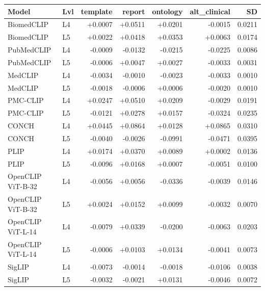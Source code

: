 \begin{tabular}{llrrrrr}
\toprule
Model & Lvl & template & report & ontology & alt_clinical & SD \\
\midrule
BiomedCLIP & L4 & +0.0007 & +0.0511 & +0.0201 & -0.0015 & 0.0211 \\
BiomedCLIP & L5 & +0.0022 & +0.0418 & +0.0353 & +0.0063 & 0.0174 \\
PubMedCLIP & L4 & -0.0009 & -0.0132 & -0.0215 & -0.0225 & 0.0086 \\
PubMedCLIP & L5 & -0.0006 & +0.0047 & +0.0027 & -0.0033 & 0.0031 \\
MedCLIP & L4 & -0.0034 & -0.0010 & -0.0023 & -0.0033 & 0.0010 \\
MedCLIP & L5 & -0.0018 & -0.0006 & +0.0006 & -0.0020 & 0.0010 \\
PMC-CLIP & L4 & +0.0247 & +0.0510 & +0.0209 & -0.0029 & 0.0191 \\
PMC-CLIP & L5 & -0.0121 & +0.0278 & +0.0157 & -0.0324 & 0.0235 \\
CONCH & L4 & +0.0445 & +0.0864 & +0.0128 & +0.0865 & 0.0310 \\
CONCH & L5 & -0.0040 & -0.0026 & -0.0991 & -0.0471 & 0.0395 \\
PLIP & L4 & +0.0174 & +0.0370 & +0.0089 & +0.0002 & 0.0136 \\
PLIP & L5 & -0.0096 & +0.0168 & +0.0007 & -0.0051 & 0.0100 \\
OpenCLIP ViT-B-32 & L4 & -0.0056 & +0.0056 & -0.0336 & -0.0039 & 0.0146 \\
OpenCLIP ViT-B-32 & L5 & +0.0024 & +0.0152 & +0.0099 & -0.0032 & 0.0070 \\
OpenCLIP ViT-L-14 & L4 & -0.0079 & +0.0339 & -0.0200 & -0.0063 & 0.0203 \\
OpenCLIP ViT-L-14 & L5 & -0.0006 & +0.0103 & +0.0134 & -0.0041 & 0.0073 \\
SigLIP & L4 & -0.0073 & -0.0014 & -0.0018 & -0.0106 & 0.0038 \\
SigLIP & L5 & -0.0032 & -0.0021 & +0.0131 & -0.0046 & 0.0072 \\
\bottomrule
\end{tabular}
